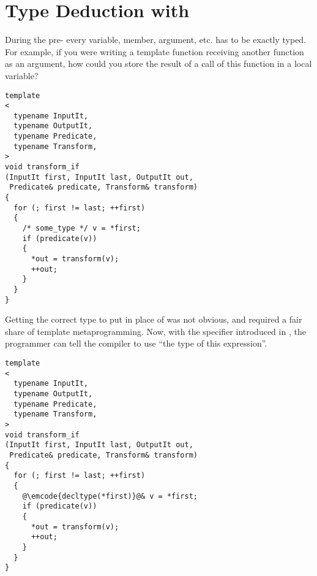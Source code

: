 \section{Type Deduction with }
\label{decltype}

During the pre- every variable, member, argument, etc. has to be
exactly typed. For example, if you were writing a template function
receiving another function as an argument, how could you store the
result of a call of this function in a local variable?

\begin{lstlisting}
template
<
  typename InputIt,
  typename OutputIt,
  typename Predicate,
  typename Transform,
>
void transform_if
(InputIt first, InputIt last, OutputIt out,
 Predicate& predicate, Transform& transform)
{
  for (; first != last; ++first)
  {
    /* some_type */ v = *first;
    if (predicate(v))
    {
      *out = transform(v);
      ++out;
    }
  }
}
\end{lstlisting}

Getting the correct type to put in place of  was not
obvious, and required a fair share of template metaprogramming. Now,
with the  specifier introduced in , the
programmer can tell the compiler to use ``the type of this
expression''.


\begin{lstlisting}
template
<
  typename InputIt,
  typename OutputIt,
  typename Predicate,
  typename Transform,
>
void transform_if
(InputIt first, InputIt last, OutputIt out,
 Predicate& predicate, Transform& transform)
{
  for (; first != last; ++first)
  {
    @\emcode{decltype(*first)}@& v = *first;
    if (predicate(v))
    {
      *out = transform(v);
      ++out;
    }
  }
}
\end{lstlisting}
